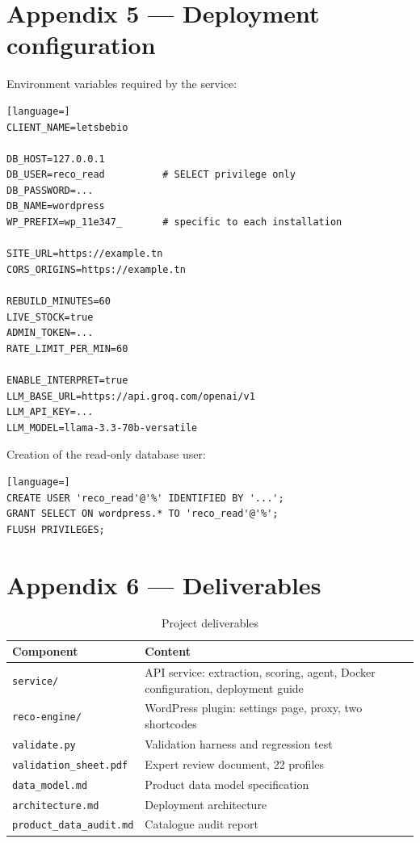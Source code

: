 \section*{Appendix 5 --- Deployment configuration}

Environment variables required by the service:

\begin{lstlisting}[language=]
CLIENT_NAME=letsbebio

DB_HOST=127.0.0.1
DB_USER=reco_read          # SELECT privilege only
DB_PASSWORD=...
DB_NAME=wordpress
WP_PREFIX=wp_11e347_       # specific to each installation

SITE_URL=https://example.tn
CORS_ORIGINS=https://example.tn

REBUILD_MINUTES=60
LIVE_STOCK=true
ADMIN_TOKEN=...
RATE_LIMIT_PER_MIN=60

ENABLE_INTERPRET=true
LLM_BASE_URL=https://api.groq.com/openai/v1
LLM_API_KEY=...
LLM_MODEL=llama-3.3-70b-versatile
\end{lstlisting}

Creation of the read-only database user:

\begin{lstlisting}[language=]
CREATE USER 'reco_read'@'%' IDENTIFIED BY '...';
GRANT SELECT ON wordpress.* TO 'reco_read'@'%';
FLUSH PRIVILEGES;
\end{lstlisting}

\section*{Appendix 6 --- Deliverables}

\begin{table}[H]
\caption{Project deliverables}
\label{tab:deliverables}
\centering
\begin{tabularx}{\textwidth}{L{5.4cm} X}
\toprule
\textbf{Component} & \textbf{Content} \\
\midrule
\texttt{service/} & API service: extraction, scoring, agent, Docker configuration, deployment guide \\
\texttt{reco-engine/} & WordPress plugin: settings page, proxy, two shortcodes \\
\texttt{validate.py} & Validation harness and regression test \\
\texttt{validation\_sheet.pdf} & Expert review document, 22 profiles \\
\texttt{data\_model.md} & Product data model specification \\
\texttt{architecture.md} & Deployment architecture \\
\texttt{product\_data\_audit.md} & Catalogue audit report \\
\bottomrule
\end{tabularx}
\end{table}

\clearpage
